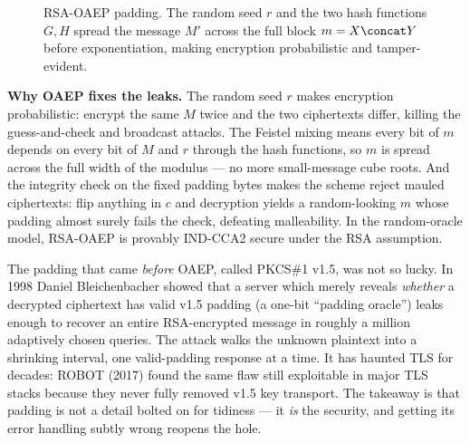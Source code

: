 \begin{figure}[H]
\centering
{}
\caption{RSA-OAEP padding. The random seed $r$ and the two hash functions $G,H$ spread the message $M'$ across the full block $m=X\concat Y$ before exponentiation, making encryption probabilistic and tamper-evident.}
\label{ch19:oaep-diagram}
\end{figure}

\begin{whybox}
\textbf{Why OAEP fixes the leaks.} The random seed $r$ makes encryption probabilistic: encrypt the same $M$ twice and the two ciphertexts differ, killing the guess-and-check and broadcast attacks. The Feistel mixing means every bit of $m$ depends on every bit of $M$ and $r$ through the hash functions, so $m$ is spread across the full width of the modulus --- no more small-message cube roots. And the integrity check on the fixed padding bytes makes the scheme reject mauled ciphertexts: flip anything in $c$ and decryption yields a random-looking $m$ whose padding almost surely fails the check, defeating malleability. In the random-oracle model, RSA-OAEP is provably IND-CCA2 secure under the RSA assumption.
\end{whybox}

\begin{attackbox}
The padding that came \emph{before} OAEP, called PKCS\#1 v1.5, was not so lucky. In 1998 Daniel Bleichenbacher showed that a server which merely reveals \emph{whether} a decrypted ciphertext has valid v1.5 padding (a one-bit ``padding oracle'') leaks enough to recover an entire RSA-encrypted message in roughly a million adaptively chosen queries. The attack walks the unknown plaintext into a shrinking interval, one valid-padding response at a time. It has haunted TLS for decades: ROBOT (2017) found the same flaw still exploitable in major TLS stacks because they never fully removed v1.5 key transport. The takeaway is that padding is not a detail bolted on for tidiness --- it \emph{is} the security, and getting its error handling subtly wrong reopens the hole.
\end{attackbox}

